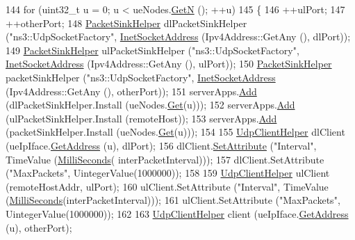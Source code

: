 \begin{DoxyCode}
144   \textcolor{keywordflow}{for} (uint32\_t u = 0; u < ueNodes.\hyperlink{classns3_1_1NodeContainer_aed647ac56d0407a7706aba02eb44b951}{GetN} (); ++u)
145     \{
146       ++ulPort;
147       ++otherPort;
148       \hyperlink{classns3_1_1PacketSinkHelper}{PacketSinkHelper} dlPacketSinkHelper (\textcolor{stringliteral}{"ns3::UdpSocketFactory"}, 
      \hyperlink{classns3_1_1InetSocketAddress}{InetSocketAddress} (Ipv4Address::GetAny (), dlPort));
149       \hyperlink{classns3_1_1PacketSinkHelper}{PacketSinkHelper} ulPacketSinkHelper (\textcolor{stringliteral}{"ns3::UdpSocketFactory"}, 
      \hyperlink{classns3_1_1InetSocketAddress}{InetSocketAddress} (Ipv4Address::GetAny (), ulPort));
150       \hyperlink{classns3_1_1PacketSinkHelper}{PacketSinkHelper} packetSinkHelper (\textcolor{stringliteral}{"ns3::UdpSocketFactory"}, 
      \hyperlink{classns3_1_1InetSocketAddress}{InetSocketAddress} (Ipv4Address::GetAny (), otherPort));
151       serverApps.\hyperlink{classns3_1_1ApplicationContainer_ad09ab1a1ad5849d518d5f4c262e38152}{Add} (dlPacketSinkHelper.Install (ueNodes.\hyperlink{classns3_1_1NodeContainer_a9ed96e2ecc22e0f5a3d4842eb9bf90bf}{Get}(u)));
152       serverApps.\hyperlink{classns3_1_1ApplicationContainer_ad09ab1a1ad5849d518d5f4c262e38152}{Add} (ulPacketSinkHelper.Install (remoteHost));
153       serverApps.\hyperlink{classns3_1_1ApplicationContainer_ad09ab1a1ad5849d518d5f4c262e38152}{Add} (packetSinkHelper.Install (ueNodes.\hyperlink{classns3_1_1NodeContainer_a9ed96e2ecc22e0f5a3d4842eb9bf90bf}{Get}(u)));
154 
155       \hyperlink{classns3_1_1UdpClientHelper}{UdpClientHelper} dlClient (ueIpIface.\hyperlink{classns3_1_1Ipv4InterfaceContainer_ae63208dcd222be986822937ee4aa828c}{GetAddress} (u), dlPort);
156       dlClient.\hyperlink{classns3_1_1UdpClientHelper_a8bbae16a28f85ab3f3b5aa4642edfeae}{SetAttribute} (\textcolor{stringliteral}{"Interval"}, TimeValue (\hyperlink{group__timecivil_gaf26127cf4571146b83a92ee18679c7a9}{MilliSeconds}(
      interPacketInterval)));
157       dlClient.SetAttribute (\textcolor{stringliteral}{"MaxPackets"}, UintegerValue(1000000));
158 
159       \hyperlink{classns3_1_1UdpClientHelper}{UdpClientHelper} ulClient (remoteHostAddr, ulPort);
160       ulClient.SetAttribute (\textcolor{stringliteral}{"Interval"}, TimeValue (\hyperlink{group__timecivil_gaf26127cf4571146b83a92ee18679c7a9}{MilliSeconds}(interPacketInterval)));
161       ulClient.SetAttribute (\textcolor{stringliteral}{"MaxPackets"}, UintegerValue(1000000));
162 
163       \hyperlink{classns3_1_1UdpClientHelper}{UdpClientHelper} client (ueIpIface.\hyperlink{classns3_1_1Ipv4InterfaceContainer_ae63208dcd222be986822937ee4aa828c}{GetAddress} (u), otherPort);

\end{DoxyCode}
